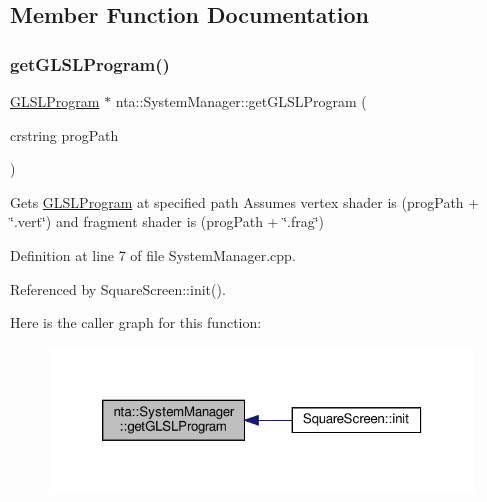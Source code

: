 \subsection{Member Function Documentation}
\mbox{\label{classnta_1_1SystemManager_af37be3ff4538da0a95b5ca257187077c}} 
\subsubsection{\texorpdfstring{get\+G\+L\+S\+L\+Program()}{getGLSLProgram()}\hspace{0.1cm}{\footnotesize\ttfamily [1/2]}}
{\footnotesize\ttfamily \hyperlink{classnta_1_1GLSLProgram}{G\+L\+S\+L\+Program} $\ast$ nta\+::\+System\+Manager\+::get\+G\+L\+S\+L\+Program (\begin{DoxyParamCaption}\item[{crstring}]{prog\+Path }\end{DoxyParamCaption})\hspace{0.3cm}{\ttfamily [static]}}

Gets \hyperlink{classnta_1_1GLSLProgram}{G\+L\+S\+L\+Program} at specified path Assumes vertex shader is (prog\+Path + \char`\"{}.\+vert\char`\"{}) and fragment shader is (prog\+Path + \char`\"{}.\+frag\char`\"{}) 

Definition at line 7 of file System\+Manager.\+cpp.



Referenced by Square\+Screen\+::init().

Here is the caller graph for this function\+:\nopagebreak
\begin{figure}[H]
\begin{center}
\leavevmode
\includegraphics[width=320pt]{db/d25/classnta_1_1SystemManager_af37be3ff4538da0a95b5ca257187077c_icgraph}
\end{center}
\end{figure}
\mbox{\label{classnta_1_1SystemManager_a656e005054ec89f1370616aa499b8a1a}} 
